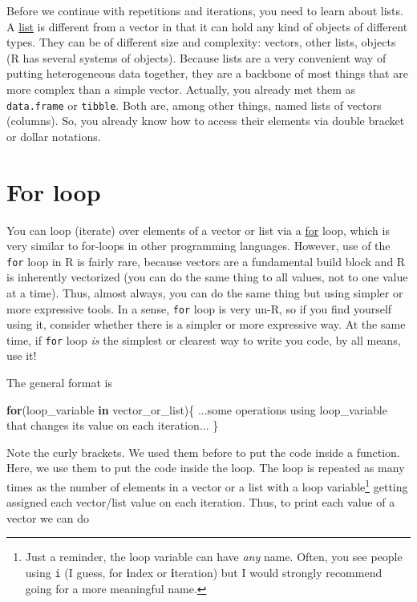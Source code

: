 \documentclass[
]{book}
\newenvironment{Shaded}{\begin{snugshade}}{\end{snugshade}}
\newcommand{\ControlFlowTok}[1]{\textcolor[rgb]{0.13,0.29,0.53}{\textbf{#1}}}
\newcommand{\NormalTok}[1]{#1}
\begin{document}
Before we continue with repetitions and iterations, you need to learn about lists. A \href{https://stat.ethz.ch/R-manual/R-devel/library/base/html/list.html}{list} is different from a vector in that it can hold any kind of objects of different types. They can be of different size and complexity: vectors, other lists, objects (R has several systems of objects). Because lists are a very convenient way of putting heterogeneous data together, they are a backbone of most things that are more complex than a simple vector. Actually, you already met them as \texttt{data.frame} or \texttt{tibble}. Both are, among other things, named lists of vectors (columns). So, you already know how to access their elements via double bracket or dollar notations.

\hypertarget{forloop}{%
\section{For loop}\label{forloop}}

You can loop (iterate) over elements of a vector or list via a \href{https://stat.ethz.ch/R-manual/R-devel/library/base/html/Control.html}{for} loop, which is very similar to for-loops in other programming languages. However, use of the \texttt{for} loop in R is fairly rare, because vectors are a fundamental build block and R is inherently vectorized (you can do the same thing to all values, not to one value at a time). Thus, almost always, you can do the same thing but using simpler or more expressive tools. In a sense, \texttt{for} loop is very un-R, so if you find yourself using it, consider whether there is a simpler or more expressive way. At the same time, if \texttt{for} loop \emph{is} the simplest or clearest way to write you code, by all means, use it!

The general format is

\begin{Shaded}
\begin{Highlighting}[]
\ControlFlowTok{for}\NormalTok{(loop\_variable }\ControlFlowTok{in}\NormalTok{ vector\_or\_list)\{}
\NormalTok{  ...some operations using loop\_variable that}
\NormalTok{  changes its value on each iteration... }
\NormalTok{\}}
\end{Highlighting}
\end{Shaded}

Note the curly brackets. We used them before to put the code inside a function. Here, we use them to put the code inside the loop. The loop is repeated as many times as the number of elements in a vector or a list with a loop variable\footnote{Just a reminder, the loop variable can have \emph{any} name. Often, you see people using \texttt{i} (I guess, for \textbf{i}ndex or \textbf{i}teration) but I would strongly recommend going for a more meaningful name.} getting assigned each vector/list value on each iteration. Thus, to print each value of a vector we can do
\end{document}
